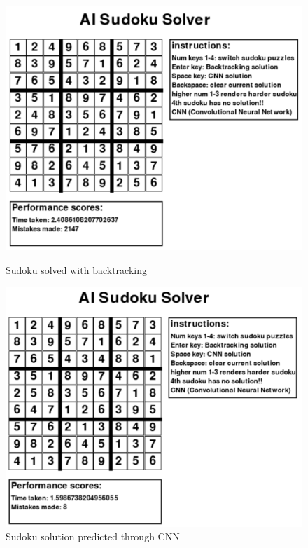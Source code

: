 \documentclass[]{final_report}
\begin{document}
\begin{figure}[ht]
    \centering  
    \begin{minipage}{0.8\textwidth} 
        \includegraphics[width=\textwidth]{images/Final solved (1).png} 
        \caption{Sudoku solved with backtracking} 
        \label{fig: backtracking solution} 
    \end{minipage} 
    \hfill 
    \begin{minipage}{0.8\textwidth} 
        \includegraphics[width=\textwidth]{images/Final solved (2).png} 
        \caption{Sudoku solution predicted through CNN} 
        \label{fig: CNN solution} 
    \end{minipage}
\end{figure}
\end{document}
